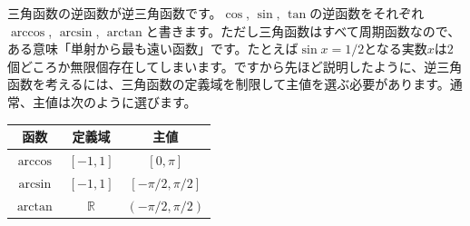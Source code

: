 三角函数の逆函数が逆三角函数です。$\cos$, $\sin$, $\tan$の逆函数をそれぞれ$\arccos$, $\arcsin$, $\arctan$と書きます。ただし三角函数はすべて周期函数なので、ある意味「単射から最も遠い函数」です。たとえば$\sin x = 1/2$となる実数$x$は$2$個どころか無限個存在してしまいます。ですから先ほど説明したように、逆三角函数を考えるには、三角函数の定義域を制限して主値を選ぶ必要があります。通常、主値は次のように選びます。

\begin{table}[h!tbp]
\begin{center}
\begin{tabular}{ccc} \hline
函数 & 定義域 & 主値 \\ \hline
$\arccos$ & $[-1,1]$ & $[0,\pi]$ \\
$\arcsin$ & $[-1,1]$ & $[-\pi/2,\pi/2]$ \\
$\arctan$ & $\mathbb{R}$ & $(-\pi/2,\pi/2)$ \\ \hline
\end{tabular}
\end{center}
\end{table}

